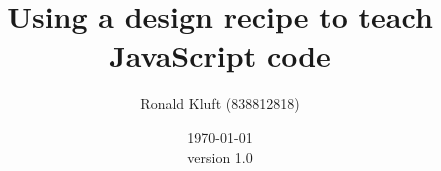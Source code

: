 \documentclass{article}
\begin{document}
 

\title{Using a design recipe to teach JavaScript code}
\author{Ronald Kluft (838812818)} 
\date{\today \\version 1.0} 
\maketitle 





\printglossaries
\end{document}
